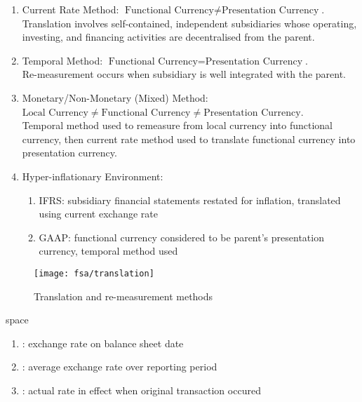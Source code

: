 \begin{method} 
\begin{enumerate}[label=\roman*.]
\setlength{\itemsep}{0pt}
\item Current Rate Method: $\text{Functional Currency} \neq \text{Presentation Currency}$.\\
Translation involves self-contained, independent subsidiaries whose operating, investing, and financing activities are decentralised from the parent.
\item Temporal Method: $\text{Functional Currency} = \text{Presentation Currency}$.\\
Re-measurement occurs when subsidiary is well integrated with the parent.
\item Monetary/Non-Monetary (Mixed) Method: $\text{Local Currency} \neq \text{Functional Currency} \neq \text{Presentation Currency}$.\\
Temporal method used to remeasure from local currency into functional currency, then current rate method used to translate functional currency into presentation currency.
\item Hyper-inflationary Environment:
\begin{enumerate}[label=\arabic*.]
\setlength{\itemsep}{0pt}
\item IFRS: subsidiary financial statements restated for inflation, translated using current exchange rate
\item GAAP: functional currency considered to be parent's presentation currency, temporal method used
\end{enumerate}
\end{enumerate}
\end{method}

\begin{figure}[H]
\centering
\texttt{[image: fsa/translation]}
\caption{Translation and re-measurement methods}
\end{figure}

\begin{definition}{\color{white}space}
\begin{enumerate}[label=\roman*.]
\setlength{\itemsep}{0pt}
\item {}: exchange rate on balance sheet date
\item {}: average exchange rate over reporting period
\item {}: actual rate in effect when original transaction occured
\end{enumerate}
\end{definition}


